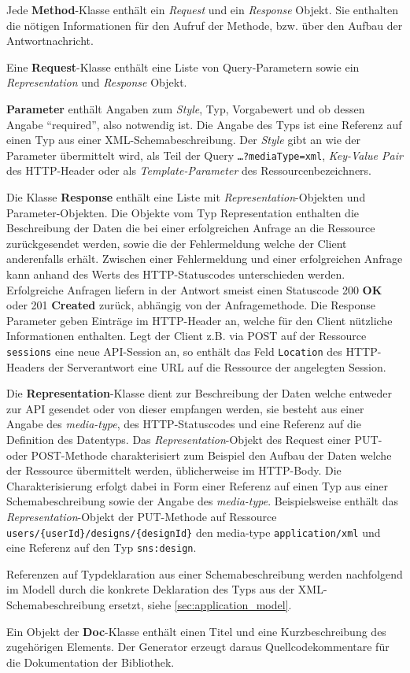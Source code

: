 Jede \textbf{Method}-Klasse enthält ein \emph{Request} und ein \emph{Response} Objekt. Sie enthalten die nötigen Informationen für den Aufruf der Methode, bzw. über den Aufbau der Antwortnachricht.

Eine \textbf{Request}-Klasse enthält eine Liste von Query-Parametern sowie ein \emph{Representation} und \emph{Response} Objekt.

\textbf{Parameter} enthält Angaben zum \emph{Style}, Typ, Vorgabewert und ob dessen Angabe \enquote{required}, also notwendig ist. Die Angabe des Typs ist eine Referenz auf einen Typ aus einer XML-Schemabeschreibung. Der \emph{Style} gibt an wie der Parameter übermittelt wird, als Teil der Query \texttt{\ldots{}?mediaType=xml}, \emph{Key-Value Pair} des HTTP-Header oder als \emph{Template-Parameter} des Ressourcenbezeichners. 

Die Klasse \textbf{Response} enthält eine Liste mit \emph{Representation}-Objekten und Parameter-Objekten. Die Objekte vom Typ Representation enthalten die Beschreibung der Daten die bei einer erfolgreichen Anfrage an die Ressource zurückgesendet werden, sowie die der Fehlermeldung welche der Client anderenfalls erhält. Zwischen einer Fehlermeldung und einer erfolgreichen Anfrage kann anhand des Werts des HTTP-Statuscodes unterschieden werden. Erfolgreiche Anfragen liefern in der Antwort smeist einen Statuscode 200 \textbf{OK} oder 201 \textbf{Created} zurück, abhängig von der Anfragemethode. Die Response Parameter geben Einträge im HTTP-Header an, welche für den Client nützliche Informationen enthalten. Legt der Client z.B. via POST auf der Ressource \texttt{sessions} eine neue API-Session an, so enthält das Feld \texttt{Location} des HTTP-Headers der Serverantwort eine URL auf die Ressource der angelegten Session.

Die \textbf{Representation}-Klasse dient zur Beschreibung der Daten welche entweder zur API gesendet oder von dieser empfangen werden, sie besteht aus einer Angabe des \emph{media-type}, des HTTP-Statuscodes und eine Referenz auf die Definition des Datentyps. Das \emph{Representation}-Objekt des Request einer PUT- oder POST-Methode charakterisiert zum Beispiel den Aufbau der Daten welche der Ressource übermittelt werden, üblicherweise im HTTP-Body. Die Charakterisierung erfolgt dabei in Form einer Referenz auf einen Typ aus einer Schemabeschreibung sowie der Angabe des \emph{media-type}. Beispielsweise enthält das \emph{Representation}-Objekt der PUT-Methode auf Ressource \texttt{users/\{userId\}/designs/\{designId\}} den media-type \texttt{application/xml} und eine Referenz auf den Typ \texttt{sns:design}. 

Referenzen auf Typdeklaration aus einer Schemabeschreibung werden nachfolgend im Modell durch die konkrete Deklaration des Typs aus der XML-Schemabeschreibung ersetzt, siehe \cref{sec:application_model}. 

Ein Objekt der \textbf{Doc}-Klasse enthält einen Titel und eine Kurzbeschreibung des zugehörigen Elements.
Der Generator erzeugt daraus Quellcodekommentare für die Dokumentation der Bibliothek.